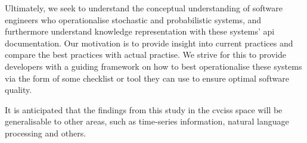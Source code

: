 Ultimately, we seek to understand the conceptual understanding of software engineers who operationalise stochastic and probabilistic systems, and furthermore understand knowledge representation with these systems' \gls{api} documentation. Our motivation is to provide insight into current practices and compare the best practices with actual practise. We strive for this to  provide developers with a guiding framework on how to best operationalise these systems via the form of some checklist or tool they can use to ensure optimal software quality.

It is anticipated that the findings from this study in the \glspl{cvcis} space will be generalisable to other areas, such as time-series information, natural language processing and others.

